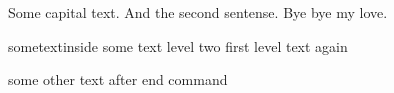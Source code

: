 
Some capital text. And the second sentense. Bye bye my love. 

	sometextinside
	{ some text level two }
	first level text again


some other text after end command
